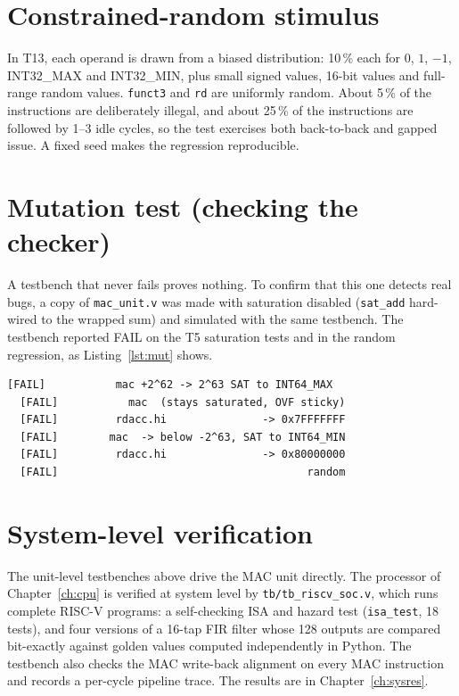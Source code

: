 \documentclass[11pt,a4paper]{report}
\newcommand{\code}[1]{\texttt{#1}}
\begin{document}
\section{Constrained-random stimulus}
In T13, each operand is drawn from a biased distribution: 10\,\% each for $0$,
$1$, $-1$, INT32\_MAX and INT32\_MIN, plus small signed values, 16-bit values
and full-range random values. \code{funct3} and \code{rd} are uniformly random.
About 5\,\% of the instructions are deliberately illegal, and about 25\,\% of
the instructions are followed by 1--3 idle cycles, so the test exercises both
back-to-back and gapped issue. A fixed seed makes the regression reproducible.

\section{Mutation test (checking the checker)}
A testbench that never fails proves nothing. To confirm that this one detects
real bugs, a copy of \code{mac\_unit.v} was made with saturation disabled
(\code{sat\_add} hard-wired to the wrapped sum) and simulated with the same
testbench. The testbench reported FAIL on the T5 saturation tests and in the
random regression, as Listing~\ref{lst:mut} shows.

\begin{lstlisting}[style=log, caption={Testbench output for the mutated design (excerpt).}, label={lst:mut}]
  [FAIL]           mac +2^62 -> 2^63 SAT to INT64_MAX
  [FAIL]           mac  (stays saturated, OVF sticky)
  [FAIL]         rdacc.hi               -> 0x7FFFFFFF
  [FAIL]        mac  -> below -2^63, SAT to INT64_MIN
  [FAIL]         rdacc.hi               -> 0x80000000
  [FAIL]                                       random
\end{lstlisting}

\section{System-level verification}
The unit-level testbenches above drive the MAC unit directly. The processor
of Chapter~\ref{ch:cpu} is verified at system level by
\code{tb/tb\_riscv\_soc.v}, which runs complete RISC-V programs: a self-checking
ISA and hazard test (\code{isa\_test}, 18 tests), and four versions of a 16-tap
FIR filter whose 128 outputs are compared bit-exactly against golden values
computed independently in Python.
The testbench also checks the MAC write-back alignment on every MAC
instruction and records a per-cycle pipeline trace. The results are in
Chapter~\ref{ch:sysres}.
\end{document}
